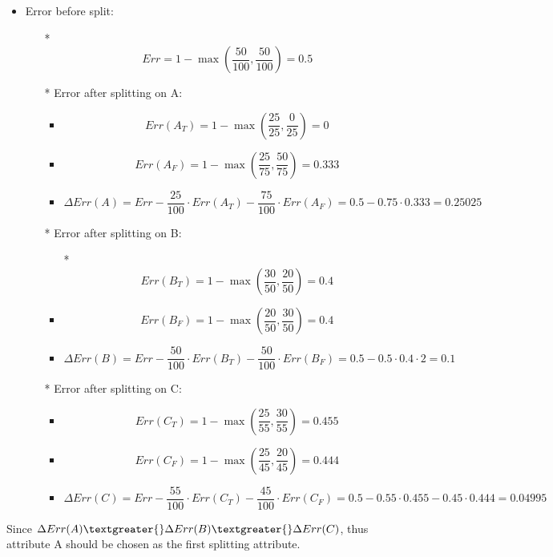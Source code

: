 \documentclass[11pt]{article}
\providecommand{\tightlist}{%
      \setlength{\itemsep}{0pt}\setlength{\parskip}{0pt}}
\begin{document}
\begin{itemize}
\tightlist
\item
  Error before split:

  \begin{itemize}
  \tightlist
  \item[*]
    \[Err = 1-\max(\frac{50}{100}, \frac{50}{100}) = 0.5\]
  \item[*]
    Error after splitting on A:

    \begin{itemize}
    \tightlist
    \item
      \[Err(A_T) = 1-\max(\frac{25}{25}, \frac{0}{25}) = 0\]
    \item
      \[Err(A_F) = 1-\max(\frac{25}{75}, \frac{50}{75}) = 0.333\]
    \item
      \[\Delta Err(A) = Err- \frac{25}{100} \cdot Err(A_T) - \frac{75}{100} \cdot Err(A_F) = 0.5 - 0.75 \cdot 0.333 = 0.25025\]
    \end{itemize}
  \item[*]
    Error after splitting on B:

    \begin{itemize}
    \tightlist
    \item[*]
      \[Err(B_T) = 1-\max(\frac{30}{50}, \frac{20}{50}) = 0.4\]
    \item
      \[Err(B_F) = 1-\max(\frac{20}{50}, \frac{30}{50}) = 0.4\]
    \item
      \[\Delta Err(B) = Err- \frac{50}{100} \cdot Err(B_T) - \frac{50}{100} \cdot Err(B_F) = 0.5 - 0.5 \cdot 0.4 \cdot 2 = 0.1\]
    \end{itemize}
  \item[*]
    Error after splitting on C:

    \begin{itemize}
    \tightlist
    \item
      \[Err(C_T) = 1-\max(\frac{25}{55}, \frac{30}{55}) = 0.455\]
    \item
      \[Err(C_F) = 1-\max(\frac{25}{45}, \frac{20}{45}) = 0.444\]
    \item
      \[\Delta Err(C) = Err- \frac{55}{100} \cdot Err(C_T) - \frac{45}{100} \cdot Err(C_F) = 0.5 - 0.55 \cdot 0.455 - 0.45 \cdot 0.444 = 0.04995\]
    \end{itemize}
  \end{itemize}
\end{itemize}

Since \(\Delta Err(A) \textgreater{} \Delta Err(B) \textgreater{}
\Delta Err(C) \), thus attribute A should be chosen as the first
splitting attribute.
\end{document}
